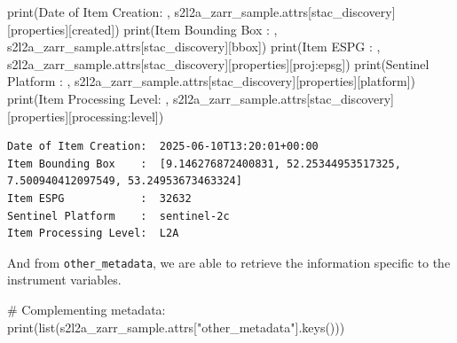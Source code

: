 \documentclass[
  letterpaper,
  DIV=11,
  numbers=noendperiod]{scrreprt}
\newenvironment{Shaded}{\begin{snugshade}}{\end{snugshade}}
\newcommand{\BuiltInTok}[1]{\textcolor[rgb]{0.00,0.23,0.31}{#1}}
\newcommand{\CommentTok}[1]{\textcolor[rgb]{0.37,0.37,0.37}{#1}}
\newcommand{\NormalTok}[1]{\textcolor[rgb]{0.00,0.23,0.31}{#1}}
\newcommand{\StringTok}[1]{\textcolor[rgb]{0.13,0.47,0.30}{#1}}
\begin{document}
\begin{Shaded}
\begin{Highlighting}[]
\BuiltInTok{print}\NormalTok{(}\StringTok{\textquotesingle{}Date of Item Creation: \textquotesingle{}}\NormalTok{, s2l2a\_zarr\_sample.attrs[}\StringTok{\textquotesingle{}stac\_discovery\textquotesingle{}}\NormalTok{][}\StringTok{\textquotesingle{}properties\textquotesingle{}}\NormalTok{][}\StringTok{\textquotesingle{}created\textquotesingle{}}\NormalTok{])}
\BuiltInTok{print}\NormalTok{(}\StringTok{\textquotesingle{}Item Bounding Box    : \textquotesingle{}}\NormalTok{, s2l2a\_zarr\_sample.attrs[}\StringTok{\textquotesingle{}stac\_discovery\textquotesingle{}}\NormalTok{][}\StringTok{\textquotesingle{}bbox\textquotesingle{}}\NormalTok{])}
\BuiltInTok{print}\NormalTok{(}\StringTok{\textquotesingle{}Item ESPG            : \textquotesingle{}}\NormalTok{, s2l2a\_zarr\_sample.attrs[}\StringTok{\textquotesingle{}stac\_discovery\textquotesingle{}}\NormalTok{][}\StringTok{\textquotesingle{}properties\textquotesingle{}}\NormalTok{][}\StringTok{\textquotesingle{}proj:epsg\textquotesingle{}}\NormalTok{])}
\BuiltInTok{print}\NormalTok{(}\StringTok{\textquotesingle{}Sentinel Platform    : \textquotesingle{}}\NormalTok{, s2l2a\_zarr\_sample.attrs[}\StringTok{\textquotesingle{}stac\_discovery\textquotesingle{}}\NormalTok{][}\StringTok{\textquotesingle{}properties\textquotesingle{}}\NormalTok{][}\StringTok{\textquotesingle{}platform\textquotesingle{}}\NormalTok{])}
\BuiltInTok{print}\NormalTok{(}\StringTok{\textquotesingle{}Item Processing Level: \textquotesingle{}}\NormalTok{, s2l2a\_zarr\_sample.attrs[}\StringTok{\textquotesingle{}stac\_discovery\textquotesingle{}}\NormalTok{][}\StringTok{\textquotesingle{}properties\textquotesingle{}}\NormalTok{][}\StringTok{\textquotesingle{}processing:level\textquotesingle{}}\NormalTok{])}
\end{Highlighting}
\end{Shaded}

\begin{verbatim}
Date of Item Creation:  2025-06-10T13:20:01+00:00
Item Bounding Box    :  [9.146276872400831, 52.25344953517325, 7.500940412097549, 53.24953673463324]
Item ESPG            :  32632
Sentinel Platform    :  sentinel-2c
Item Processing Level:  L2A
\end{verbatim}

And from \texttt{other\_metadata}, we are able to retrieve the
information specific to the instrument variables.

\begin{Shaded}
\begin{Highlighting}[]
\CommentTok{\# Complementing metadata:}
\BuiltInTok{print}\NormalTok{(}\BuiltInTok{list}\NormalTok{(s2l2a\_zarr\_sample.attrs[}\StringTok{"other\_metadata"}\NormalTok{].keys()))}
\end{Highlighting}
\end{Shaded}
\end{document}

